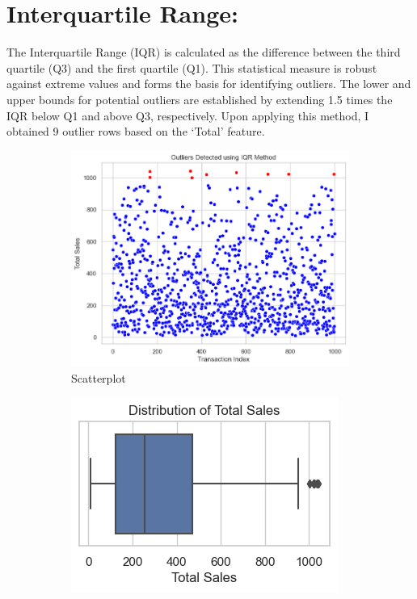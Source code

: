 \section{Interquartile Range:}
The Interquartile Range (IQR) is calculated as the difference between the third quartile (Q3) and the first quartile (Q1). This statistical measure is robust against extreme values and forms the basis for identifying outliers. The lower and upper bounds for potential outliers are established by extending 1.5 times the IQR below Q1 and above Q3, respectively. 
\newline
Upon applying this method, I obtained 9 outlier rows based on the ‘Total’ feature.

\begin{figure}[h]
    \centering
    \begin{subfigure}{0.5\textwidth}
        \centering
        \includegraphics[width=\linewidth]{Chapters/ch11/ch_11_scatterplot.png}
        \caption{Scatterplot}
        \label{fig:scatterplot}
    \end{subfigure}%
    \begin{subfigure}{0.5\textwidth}
        \centering
        \includegraphics[width=\linewidth]{Chapters/ch11/ch_11_boxplot.png}

\end{subfigure}
\end{figure}
